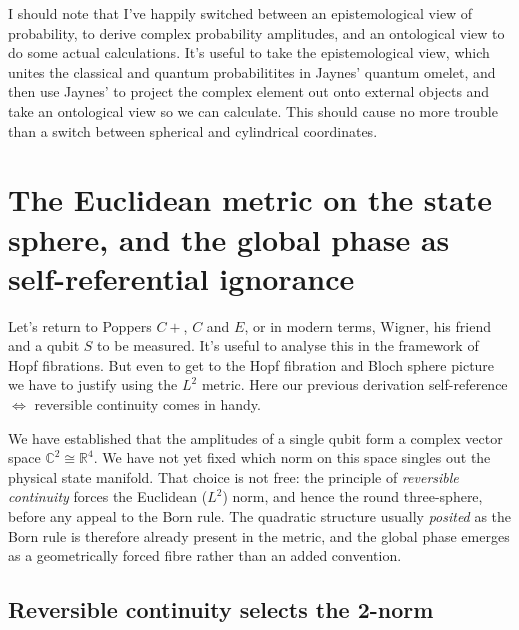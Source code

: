 \documentclass{article}
\begin{document}
I should note that I've happily switched between an epistemological view of probability, to derive complex probability amplitudes, and an ontological view to do some actual calculations. It's useful to take the epistemological view, which unites the classical and quantum probabilitites in Jaynes' quantum omelet, and then use Jaynes'  to project the complex element out onto external objects and take an ontological view so we can calculate. This should cause no more trouble than a switch between spherical and cylindrical coordinates. 


\section{The Euclidean metric on the state sphere, and the global phase as self-referential ignorance}
\label{sec:l2-metric-fibre}
Let's return to Poppers $C+$, $C$ and $E$, or in modern terms, Wigner, his friend and a qubit $S$ to be measured. It's useful to analyse this in the framework of Hopf fibrations. But even to get to the Hopf fibration and Bloch sphere picture we have to justify using the $L^2$ metric. Here our previous derivation self-reference $\iff$ reversible continuity comes in handy. 


We have established that the amplitudes of a single qubit form a complex vector space $\mathbb{C}^{2}\cong\mathbb{R}^{4}$. We have not yet fixed which norm on this space singles out the physical state manifold. That choice is not free: the principle of \emph{reversible continuity} forces the Euclidean ($L^{2}$) norm, and hence the round three-sphere, before any appeal to the Born rule. The quadratic structure usually \emph{posited} as the Born rule is therefore already present in the metric, and the global phase emerges as a geometrically forced fibre rather than an added convention.

\subsection{Reversible continuity selects the 2-norm}
\label{sec:reversible-continuity-l2}
\end{document}
